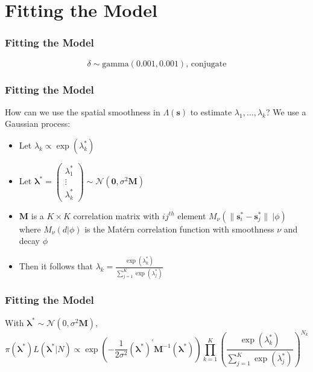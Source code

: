 \documentclass[10pt, compress]{beamer}
\begin{document}
  \section{Fitting the Model}
  \begin{frame}
    \frametitle{Fitting the Model}
      $$\delta \sim \text{gamma}(0.001, 0.001)\text{,  conjugate}$$
  \end{frame}
  \begin{frame}
    \frametitle{Fitting the Model}
    How can we use the spatial smoothness in $\Lambda(\mathbf{s})$ to estimate $\lambda_1, \dots, \lambda_k$?
    \pause
    \newline
    \newline
    We use a Gaussian process:
    \begin{itemize}
      \item Let $\lambda_k \propto \exp(\lambda_k^{*})$
      \item Let $\boldsymbol{\lambda}^{*} = \begin{pmatrix} \lambda_1^{*} \\ \vdots \\ \lambda_k^{*} \end{pmatrix} \sim \mathcal{N}(\mathbf{0}, \sigma^2\mathbf{M})$
      \item $\mathbf{M}$ is a $K \times K$ correlation matrix with $ij^{th}$ element $M_{\nu}(\|\mathbf{s}_i^{*}-\mathbf{s}_j^{*}\|~| \phi)$ where $M_{\nu}(d | \phi)$
            is the Mat\'{e}rn correlation function with smoothness $\nu$ and decay $\phi$
      \item Then it follows that $\lambda_k = \frac{\exp(\lambda_k^{*})}{\sum_{j=1}^{K}\exp(\lambda_j^{*})}$

    \end{itemize}
  \end{frame}
  \begin{frame}
    \frametitle{Fitting the Model}
      With $\boldsymbol\lambda^{*} \sim \mathcal{N}(0, \sigma^2\mathbf{M})$, 
    $$ \pi(\boldsymbol\lambda^{*})L(\boldsymbol\lambda^{*} | N) \propto 
      \exp\left(-\frac{1}{2\sigma^2}(\boldsymbol\lambda^{*})^{'}\mathbf{M}^{-1}(\boldsymbol\lambda^{*})\right)\prod_{k=1}^{K}\left(\frac{\exp(\lambda_k^{*})}{\sum_{j=1}^{K}\exp(\lambda_j^{*})}\right)^{N_k} $$
  \end{frame}
\end{document}
